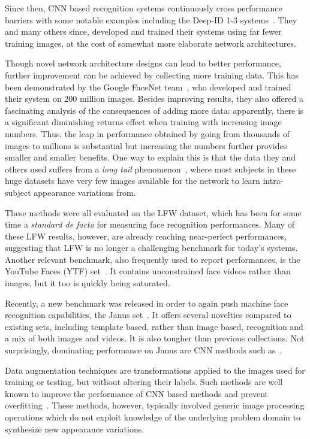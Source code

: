 \documentclass[runningheads]{llncs}
\newcommand{\minisection}[1]{\vspace{0.04in} \noindent {\bf #1:} }
\begin{document}
Since then, CNN based recognition systems continuously cross performance barriers with some notable examples including the Deep-ID 1-3 systems~\cite{sun2014deep,sun2014deep2,sun2015deepid3}. They and many others since, developed and trained their systems using far fewer training images, at the cost of somewhat more elaborate network architectures. 


Though novel network architecture designs can lead to better performance, further improvement can be achieved by collecting more training data. This has been demonstrated by the Google FaceNet team~\cite{schroff2015facenet}, who developed and trained their system on 200 million images. Besides improving results, they also offered a fascinating analysis of the consequences of adding more data: apparently, there is a significant diminishing returns effect when training with increasing image numbers. Thus, the leap in performance obtained by going from thousands of images to millions is substantial but increasing the numbers further provides smaller and smaller benefits. One way to explain this is that the data they and others used suffers from a {\em long tail} phenomenon~\cite{yi2014learning}, where most subjects in these huge datasets have very few images available for the network to learn intra-subject appearance variations from.  

These methods were all evaluated on the LFW dataset, which has been for some time a {\em standard de facto} for measuring face recognition performances. Many of these LFW results, however, are already reaching near-perfect performances, suggesting that LFW is no longer a challenging benchmark for today's systems. Another relevant benchmark, also frequently used to report performances, is the YouTube Faces (YTF) set~\cite{wolf2011effective}. It contains unconstrained face videos rather than images, but it too is quickly being saturated. 

Recently, a new benchmark was released in order to again push machine face recognition capabilities, the Janus set~\cite{klare2015pushing}. It offers several novelties compared to existing sets, including template based, rather than image based, recognition and a mix of both images and videos. It is also tougher than previous collections. Not surprisingly, dominating performance on Janus are CNN methods such as~\cite{chen2015unconstrained}.



\minisection{Data augmentation} 
Data augmentation techniques are transformations applied to the images used for training or testing, but without altering their labels. Such methods are well known to improve the performance of CNN based methods and prevent overfitting~\cite{Chatfield14}. These methods, however, typically involved generic image processing operations which do not exploit knowledge of the underlying problem domain to synthesize new appearance variations. 
\end{document}
